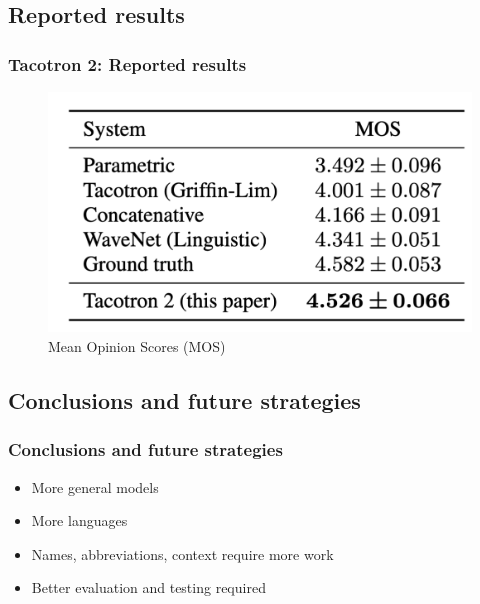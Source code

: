 \documentclass{beamer}
\begin{document}
  \subsection{Reported results}
  \begin{frame}
    \frametitle{Tacotron 2: Reported results}
    \begin{figure}
      \includegraphics[scale=0.3]{images/tacotron_results.png}
      \caption{Mean Opinion Scores (MOS)}
    \end{figure}
  \end{frame}

  \subsection{Conclusions and future strategies}
  \begin{frame}
    \frametitle{Conclusions and future strategies}
    \begin{itemize}
      \item More general models
      \item More languages
      \item Names, abbreviations, context require more work
      \item Better evaluation and testing required
    \end{itemize}
  \end{frame}
\end{document}

